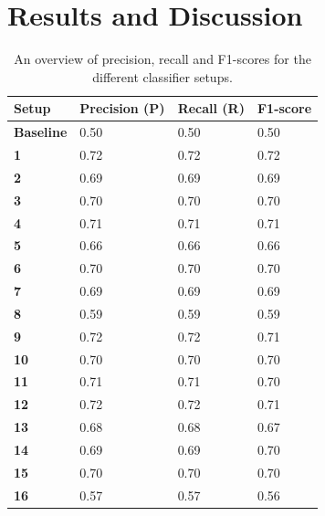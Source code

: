 \documentclass[
10pt, %
a4paper, %
oneside, %
headinclude,footinclude, %
] {book}%
\begin{document}
\chapter{Results and Discussion}
\begin{table}[]
\caption{An overview of precision, recall and F1-scores for the different classifier setups.}
\label{results-overview}
\begin{tabular}{@{}llll@{}}
\toprule
\textbf{Setup} & \textbf{Precision (P)} & \textbf{Recall (R)} & \textbf{F1-score} \\ \midrule
\textbf{Baseline} & 0.50                   & 0.50                & 0.50              \\
\textbf{1}        & 0.72                   & 0.72                & 0.72              \\
\textbf{2}        & 0.69                   & 0.69                & 0.69              \\
\textbf{3}        & 0.70                   & 0.70                & 0.70              \\
\textbf{4}        & 0.71                   & 0.71                & 0.71              \\
\textbf{5}        & 0.66                   & 0.66                & 0.66              \\
\textbf{6}        & 0.70                   & 0.70                & 0.70              \\
\textbf{7}        & 0.69                   & 0.69                & 0.69              \\
\textbf{8}        & 0.59                   & 0.59                & 0.59              \\

\textbf{9}         & 0.72                   & 0.72                & 0.71              \\
\textbf{10}       & 0.70                   & 0.70                & 0.70              \\
\textbf{11}       & 0.71                   & 0.71                & 0.70             \\
\textbf{12}       & 0.72                   & 0.72                & 0.71              \\
\textbf{13}       & 0.68                   & 0.68                & 0.67              \\
\textbf{14}       & 0.69                   & 0.69                & 0.70              \\
\textbf{15}       & 0.70                   & 0.70                & 0.70              \\
\textbf{16}       & 0.57                  & 0.57                & 0.56              \\


\end{tabular}
\end{table}
\end{document}
